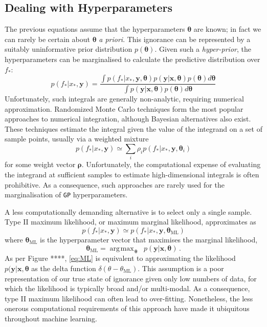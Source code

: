 \documentclass{article}
\newcommand{\xd}{\mathbf{x}}
\newcommand{\yd}{\mathbf{y}}
\DeclareMathOperator*{\argmax}{\arg\!\max\!}
\begin{document}
\subsection{Dealing with Hyperparameters}
The previous equations assume that the hyperparameters $\bm{\theta}$ are known; in fact we can rarely be certain about $\bm{\theta}$ \emph{a priori}. This ignorance can be represented by a suitably uninformative prior distribution $p(\bm{\theta})$. Given such a \emph{hyper-prior}, the hyperparameters can be marginalised to calculate the predictive distribution over $f_*$:
\begin{equation}\label{fullmargint}
p(f_* |x_*, \yd) = \frac{\int p(f_* | x_*, \yd,\bm{\theta})p(\yd|\xd,\bm{\theta})p(\bm{\theta})d\bm{\theta}}{\int p(\yd|\xd,\bm{\theta})p(\bm{\theta})d\bm{\theta}}
\end{equation}
Unfortunately, such integrals are generally non-analytic, requiring numerical approximation. Randomized Monte Carlo techniques \citet{chen2000monte} form the most popular approaches to numerical integration, although Bayesian alternatives \cite{bayesquad, osborne_aistats} also exist. 
These techniques estimate the integral given
the value of the integrand on a set of sample points, usually via a weighted mixture
\begin{equation}\label{sampling}
p(f_* |x_*, \yd) \simeq \sum_i \rho_i p(f_* | x_*, \yd,\bm{\theta}_i)
\end{equation}
for some weight vector $\bm{\rho}$. Unfortunately, the computational expense of evaluating the integrand at sufficient samples to estimate high-dimensional integrals is often prohibitive. As a consequence, such approaches are rarely used for the marginalisation of \verb"GP" hyperparameters. 

A less computationally demanding alternative is to select only a single sample. Type II maximum likelihood, or maximum marginal likelihood, approximates as
\begin{equation} \label{eq:ML}
p(f_* |x_*, \yd) \simeq p(f_* | x_*, \yd,\bm{\theta}_{\mathrm{ML}})
\end{equation}
where $\bm{\theta}_{\mathrm{ML}}$ is the hyperparameter vector that maximises the marginal likelihood, 
\begin{equation}
\bm{\theta}_{\mathrm{ML}} = \argmax_{\bm{\theta}} \;\; p(\yd|\xd,\bm{\theta})\,.
\end{equation}
As per Figure ****, \eqref{eq:ML} is equivalent to approximating the likelihood $p(\yd|\xd,\bm{\theta}$ as the delta function $\delta(\theta - \theta_{\mathrm{ML}})$. This assumption is a poor representation of our true state of ignorance given only low numbers of data, for which the likelihood is typically broad and/or multi-modal. As a consequence, type II maximum likelihood can often lead to over-fitting. Nonetheless, the less onerous computational requirements of this approach have made it ubiquitous throughout machine learning. 
\end{document}
